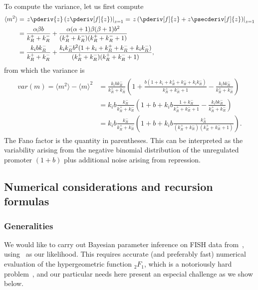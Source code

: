 To compute the variance, let us first compute
\begin{align}
\begin{split}
\langle m^2\rangle
&= \left .z\pderiv{z}\left(z\pderiv[f]{z}\right) \right|_{z=1}
= \left. z\left(\pderiv[f]{z} + z\psecderiv[f]{z}\right)\right|_{z=1}
\\
&= \frac{\alpha\beta b}{k_R^+ + k_R^-}
        + \frac{\alpha(\alpha+1)\beta(\beta+1) b^2}
                {(k_R^+ + k_R^-)(k_R^+ + k_R^- + 1)}
\\
&= \frac{k_i b k_R^-}{k_R^+ + k_R^-}
        + \frac{k_i k_R^- b^2 (1 + k_i + k_R^+ + k_R^- + k_i k_R^-)}
                {(k_R^+ + k_R^-)(k_R^+ + k_R^- + 1)},
\end{split}
\end{align}
from which the variance is
\begin{align}
\begin{split}
var(m) = \langle m^2\rangle - \langle m\rangle^2
&= \frac{k_i b k_R^-}{k_R^+ + k_R^-}
\left(
1 + \frac{b(1 + k_i + k_R^+ + k_R^- + k_i k_R^-)} {k_R^+ + k_R^- + 1}
- \frac{k_i b k_R^-}{k_R^+ + k_R^-}
\right)
\\
&= k_i b\frac{k_R^-}{k_R^+ + k_R^-}
\left(
1 + b + k_i b\frac{1 + k_R^-} {k_R^+ + k_R^- + 1}
- \frac{k_i b k_R^-}{k_R^+ + k_R^-}
\right)
\\
&= k_i b\frac{k_R^-}{k_R^+ + k_R^-}
\left(
1 + b + k_i b\frac{k_R^+}{(k_R^+ + k_R^-)(k_R^+ + k_R^- + 1)}
\right).
\end{split}
\end{align}
The Fano factor is the quantity in parentheses. This can be interpreted as
the variability arising from the negative binomial distribution of the
unregulated promoter $(1+b)$ plus additional noise arising from repression.


\subsection{Numerical considerations and recursion formulas}
\subsubsection{Generalities}
We would like to carry out Bayesian parameter inference on FISH data
from~\cite{Jones2014}, using~ as our
likelihood. This requires accurate (and preferably fast)
numerical evaluation of the hypergeometric function ${_2F_1}$,
which is a notoriously hard problem~\cite{Pearson2017, Gil2007},
and our particular needs here present an especial challenge as we show below.


